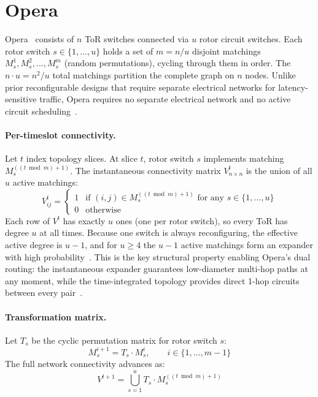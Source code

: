 \documentclass{article}
\begin{document}
    \section{Opera}

    Opera~\cite{opera} consists of $n$ ToR switches connected via $u$ rotor circuit switches. Each rotor switch $s \in \{1,\ldots,u\}$ holds a set of $m = n/u$ disjoint matchings $M_s^1, M_s^2, \ldots, M_s^m$ (random permutations), cycling through them in order. The $n \cdot u = n^2/u$ total matchings partition the complete graph on $n$ nodes. Unlike prior reconfigurable designs that require separate electrical networks for latency-sensitive traffic, Opera requires no separate electrical network and no active circuit scheduling~\cite{opera}.

    \paragraph{Per-timeslot connectivity.}
    Let $t$ index topology slices. At slice $t$, rotor switch $s$ implements matching $M_s^{((t \bmod m)+1)}$. The instantaneous connectivity matrix $V^{t}_{n \times n}$ is the union of all $u$ active matchings:
    \[
        V^{t}_{ij} =
        \begin{cases}
            1 & \text{if } (i,j) \in M_s^{((t \bmod m)+1)} \text{ for any } s \in \{1,\ldots,u\} \\
            0 & \text{otherwise}
        \end{cases}
    \]
    Each row of $V^t$ has exactly $u$ ones (one per rotor switch), so every ToR has degree $u$ at all times. Because one switch is always reconfiguring, the effective active degree is $u-1$, and for $u \geq 4$ the $u-1$ active matchings form an expander with high probability~\cite{opera}. This is the key structural property enabling Opera's dual routing: the instantaneous expander guarantees low-diameter multi-hop paths at any moment, while the time-integrated topology provides direct 1-hop circuits between every pair~\cite{opera}.

    \paragraph{Transformation matrix.}
    Let $T_s$ be the cyclic permutation matrix for rotor switch $s$:
    \[
        M_s^{i+1} = T_s \cdot M_s^{i}, \qquad i \in \{1, \ldots, m-1\}
    \]
    The full network connectivity advances as:
    \[
        V^{t+1} = \bigcup_{s=1}^{u} T_s \cdot M_s^{((t \bmod m)+1)}
    \]
\end{document}
